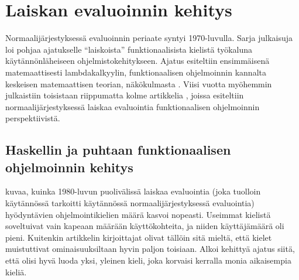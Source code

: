 

\section{Laiskan evaluoinnin kehitys \label{historia}}

Normaalijärjestyksessä evaluoinnin periaate syntyi 1970-luvulla. Sarja julkaisuja loi pohjaa ajatukselle ``laiskoista'' funktionaalisista kielistä työkaluna käytännönläheiseen ohjelmistokehitykseen. Ajatus esiteltiin ensimmäisenä matemaattisesti lambdakalkyylin, funktionaalisen ohjelmoinnin kannalta keskeisen matemaattisen teorian, näkökulmasta \citep{wadsworth1971semantics}. Viisi vuotta myöhemmin julkaistiin toisistaan riippumatta kolme artikkelia \citep{henderson1976lazy,friedman1976cuns,saslmanualturner}, joissa esiteltiin normaalijärjestyksessä laiskaa evaluointia  funktionaalisen ohjelmoinnin perspektiivistä.

\subsection{Haskellin ja puhtaan funktionaalisen ohjelmoinnin kehitys}

\citet{hudak2007history} kuvaa, kuinka 1980-luvun puolivälissä laiskaa evaluointia (joka tuolloin käytännössä tarkoitti käytännössä normaalijärjestyksessä evaluointia) hyödyntävien ohjelmointikielien määrä kasvoi nopeasti. Useimmat kielistä soveltuivat vain kapeaan määrään käyttökohteita, ja niiden käyttäjämäärä oli pieni. Kuitenkin artikkelin kirjoittajat olivat tällöin sitä mieltä, että kielet muistuttivat ominaisuuksiltaan hyvin paljon toisiaan. Alkoi kehittyä ajatus siitä, että olisi hyvä luoda yksi, yleinen kieli, joka korvaisi kerralla monia aikaisempia kieliä.

